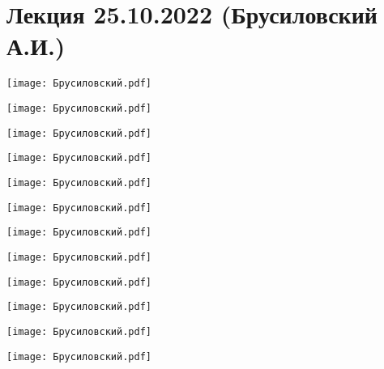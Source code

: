\documentclass[main.tex]{subfiles}
\begin{document}
\section{Лекция 25.10.2022 (Брусиловский А.И.)}

\begin{center}
\texttt{[image: Брусиловский.pdf]}
\end{center}

\begin{center}
\texttt{[image: Брусиловский.pdf]}
\end{center}

\begin{center}
\texttt{[image: Брусиловский.pdf]}
\end{center}

\begin{center}
\texttt{[image: Брусиловский.pdf]}
\end{center}

\begin{center}
\texttt{[image: Брусиловский.pdf]}
\end{center}

\begin{center}
\texttt{[image: Брусиловский.pdf]}
\end{center}

\begin{center}
\texttt{[image: Брусиловский.pdf]}
\end{center}

\begin{center}
\texttt{[image: Брусиловский.pdf]}
\end{center}

\begin{center}
\texttt{[image: Брусиловский.pdf]}
\end{center}

\begin{center}
\texttt{[image: Брусиловский.pdf]}
\end{center}

\begin{center}
\texttt{[image: Брусиловский.pdf]}
\end{center}

\begin{center}
\texttt{[image: Брусиловский.pdf]}
\end{center}
\end{document}
